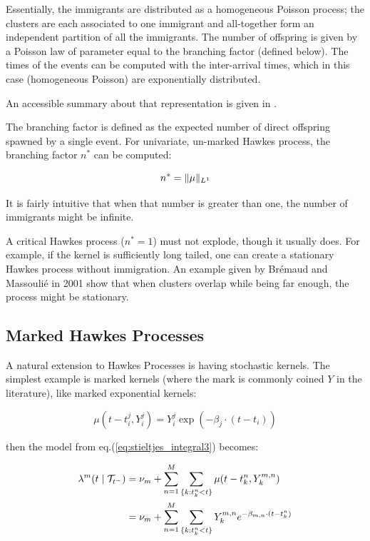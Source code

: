 Essentially, the immigrants are distributed as a homogeneous Poisson process; the clusters are each associated to one immigrant and all-together form an independent partition of all the immigrants. The number of offspring is given by a Poisson law of parameter equal to the branching factor (defined below). The times of the events can be computed with the inter-arrival times, which in this case (homogeneous Poisson) are exponentially distributed.

An accessible summary about that representation is given in \cite{socialhawkes}. 

\begin{definition}
The branching factor is defined as the expected number of direct offspring spawned by a single event. For univariate, un-marked Hawkes process, the branching factor $n^*$ can be computed:

$$ n^* = \lVert  \mu \rVert_{L^1} $$

It is fairly intuitive that when that number is greater than one, the number of immigrants might be infinite. 
\end{definition}


\begin{remarque}
A critical Hawkes process ($n^* = 1$) must not explode, though it usually does. For example, if the kernel is sufficiently long tailed, one can create a stationary Hawkes process without immigration. An example given by Brémaud and Massoulié in 2001 show that when clusters overlap while being far enough, the process might be stationary.
\end{remarque}







\subsection{Marked Hawkes Processes}
\label{subsection:marked}
A natural extension to Hawkes Processes is having stochastic kernels. The simplest example is marked kernels (where the mark is commonly coined $Y$ in the literature), like marked exponential kernels:

$$\mu(t- t_i^j, Y_i^j) =  Y_i^j \exp \left ( - \beta_j \cdot ( t - t_i ) \right ) $$

then the model from eq.(\ref{eq:stieltjes_integral3}) becomes:

\begin{align}
\lambda^m (t \mid \mathcal{T}_{t^-} ) &= \nu_m + \sum_{n = 1}^M \sum_{ \{k: t_k^n < t \}} \mu(t- t_k^{n}, Y_k^{m,n}) \notag \\
&=  \nu_m + \sum_{n = 1}^M \sum_{ \{k: t_k^n < t \}}   Y_k^{m,n} e^{- \beta_{m,n} \cdot ( t - t_k^n ) } 
\end{align}

